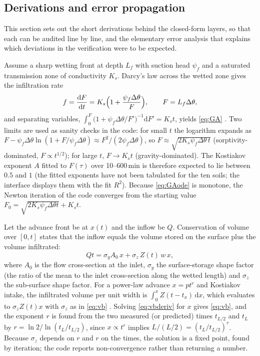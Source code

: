 \subsection{Derivations and error propagation}
\label{sec:deriv}
This section sets out the short derivations behind the closed-form layers, so that each can be audited line by line, and the elementary error analysis that explains which deviations in the verification were to be expected.

Assume a sharp wetting front at depth $L_f$ with suction head $\psi_f$ and a saturated transmission zone of conductivity $K_s$. Darcy's law across the wetted zone gives the infiltration rate
\begin{equation}
f=\frac{\mathrm dF}{\mathrm dt}=K_s\Bigl(1+\frac{\psi_f\Delta\theta}{F}\Bigr),\qquad F=L_f\Delta\theta,
\label{eq:GAode}
\end{equation}
and separating variables, $\int_0^{F}\bigl(1+\psi_f\Delta\theta/F'\bigr)^{-1}\mathrm dF'=K_st$, yields \cref{eq:GA} \citep{GreenAmpt1911}. Two limits are used as sanity checks in the code: for small $t$ the logarithm expands as $F-\psi_f\Delta\theta\ln(1+F/\psi_f\Delta\theta)\approx F^2/(2\psi_f\Delta\theta)$, so $F\approx\sqrt{2K_s\psi_f\Delta\theta\,t}$ (sorptivity-dominated, $F\propto t^{1/2}$); for large $t$, $F\to K_st$ (gravity-dominated). The Kostiakov exponent $A$ fitted to $F(\tau)$ over 10--600\,min is therefore expected to lie between $0.5$ and $1$ (the fitted exponents have not been tabulated for the ten soils; the interface displays them with the fit $R^2$). Because \cref{eq:GAode} is monotone, the Newton iteration of the code converges from the starting value $F_0=\sqrt{2K_s\psi_f\Delta\theta t}+K_st$.

Let the advance front be at $x(t)$ and the inflow be $Q$. Conservation of volume over $[0,t]$ states that the inflow equals the volume stored on the surface plus the volume infiltrated:
\begin{equation}
Qt=\sigma_yA_0\,x+\sigma_z\,Z(t)\,w\,x,
\label{eq:vbderiv}
\end{equation}
where $A_0$ is the flow cross-section at the inlet, $\sigma_y$ the surface-storage shape factor (the ratio of the mean to the inlet cross-section along the wetted length) and $\sigma_z$ the sub-surface shape factor. For a power-law advance $x=pt^{r}$ and Kostiakov intake, the infiltrated volume per unit width is $\int_0^x Z(t-t_x)\,\mathrm dx$, which evaluates to $\sigma_zZ(t)x$ with $\sigma_z$ as in \cref{eq:vb} \citep{Elliott1982,Walker1987}. Solving \cref{eq:vbderiv} for $x$ gives \cref{eq:vb}, and the exponent $r$ is found from the two measured (or predicted) times $t_{L/2}$ and $t_L$ by $r=\ln 2/\ln(t_L/t_{L/2})$, since $x\propto t^{r}$ implies $L/(L/2)=(t_L/t_{L/2})^{r}$. Because $\sigma_z$ depends on $r$ and $r$ on the times, the solution is a fixed point, found by iteration; the code reports non-convergence rather than returning a number.

